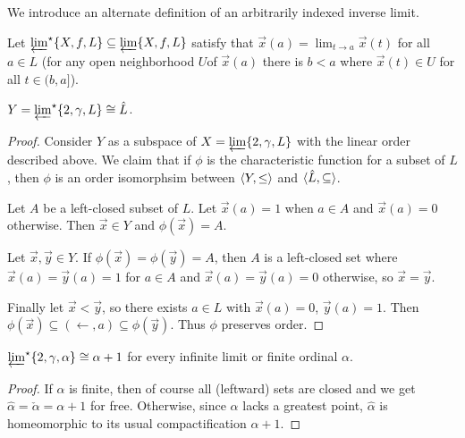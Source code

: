 \documentclass[11pt]{article}
\newcommand{\vect}{\vec}
\begin{document}
  We introduce an alternate definition of an arbitrarily indexed
  inverse limit.

  \begin{definition}
    Let \(\varprojlim^\star\{X,f,L\}\subseteq\varprojlim\{X,f,L\}\) satisfy
    that \(\vect x(a)=\lim_{t\to a}\vect x(t)\) for all \(a\in L\)
    (for any open neighborhood
    \(U\)of \(\vect x(a)\) there is \(b<a\) where \(\vect x(t)\in U\)
    for all \(t\in(b,a]\)).
  \end{definition}

  \begin{theorem}
    \(Y=\varprojlim^\star \{2, \gamma, L\}\cong \hat L\).
  \end{theorem}

  \begin{proof}
    Consider \(Y\) as a subspace of \(X=\varprojlim \{2, \gamma, L\}\) with
    the linear order described above. We claim that if \(\phi\) is the
    characteristic function for a subset of \(L\), then \(\phi\)
    is an order isomorphsim between \(\langle Y,\leq\rangle\) and
    \(\langle\hat L,\subseteq\rangle\).

    Let \(A\) be a left-closed subset of \(L\). Let \(\vect x(a)=1\) when
    \(a\in A\) and \(\vect x(a)=0\) otherwise. Then \(\vect x\in Y\) and
    \(\phi(\vect x)=A\).

    Let \(\vect x,\vect y\in Y\). If
    \(\phi(\vect x)=\phi(\vect y)=A\), then \(A\) is a
    left-closed set where \(\vect x(a)=\vect y(a)=1\) for \(a\in A\)
    and \(\vect x(a)=\vect y(a)=0\) otherwise, so \(\vect x=\vect y\).

    Finally let \(\vect x<\vect y\), so there exists \(a\in L\) with
    \(\vect x(a)=0\), \(\vect y(a)=1\). Then
    \(
      \phi(\vect x)
        \subseteq
      (\leftarrow,a)
        \subseteq
      \phi(\vect y)
    \). Thus \(\phi\) preserves order.
  \end{proof}

  \begin{corollary}
    \(
      \varprojlim^\star \{2, \gamma, \alpha\}
      \cong
      \alpha+1
    \)
    for every infinite limit or finite ordinal \(\alpha\).
  \end{corollary}

  \begin{proof}
    If \(\alpha\) is finite, then of course all (leftward) sets are
    closed and we get \(\hat\alpha=\check\alpha=\alpha+1\) for free.
    Otherwise, since \(\alpha\) lacks a greatest point, \(\hat\alpha\)
    is homeomorphic to its usual compactification \(\alpha+1\).
  \end{proof}
\end{document}
